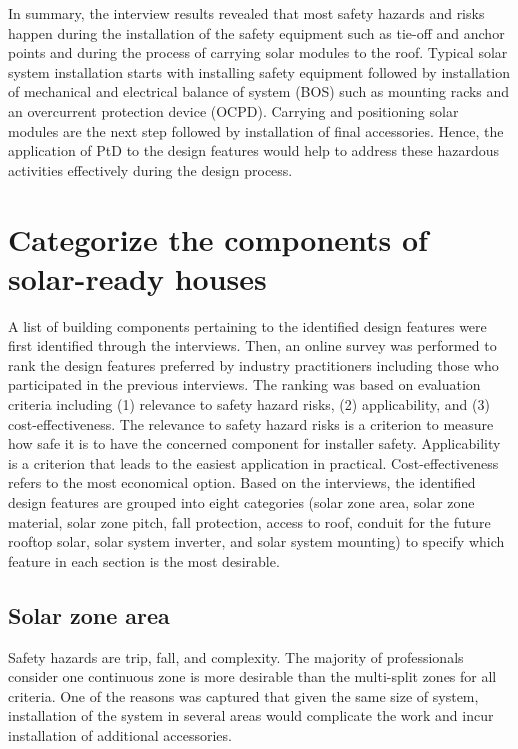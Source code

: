 \documentclass[]{article}
\begin{document}
In summary, the interview results revealed that most safety hazards and
risks happen during the installation of the safety equipment such as
tie-off and anchor points and during the process of carrying solar
modules to the roof. Typical solar system installation starts with
installing safety equipment followed by installation of mechanical and
electrical balance of system (BOS) such as mounting racks and an
overcurrent protection device (OCPD). Carrying and positioning solar
modules are the next step followed by installation of final accessories.
Hence, the application of PtD to the design features would help to
address these hazardous activities effectively during the design
process.

\hypertarget{categorize-the-components-of-solar-ready-houses}{%
\section{Categorize the components of solar-ready
houses}\label{categorize-the-components-of-solar-ready-houses}}

A list of building components pertaining to the identified design
features were first identified through the interviews. Then, an online
survey was performed to rank the design features preferred by industry
practitioners including those who participated in the previous
interviews. The ranking was based on evaluation criteria including (1)
relevance to safety hazard risks, (2) applicability, and (3)
cost-effectiveness. The relevance to safety hazard risks is a criterion
to measure how safe it is to have the concerned component for installer
safety. Applicability is a criterion that leads to the easiest
application in practical. Cost-effectiveness refers to the most
economical option. Based on the interviews, the identified design
features are grouped into eight categories (solar zone area, solar zone
material, solar zone pitch, fall protection, access to roof, conduit for
the future rooftop solar, solar system inverter, and solar system
mounting) to specify which feature in each section is the most
desirable.

\hypertarget{solar-zone-area}{%
\subsection{Solar zone area}\label{solar-zone-area}}

Safety hazards are trip, fall, and complexity. The majority of
professionals consider one continuous zone is more desirable than the
multi-split zones for all criteria. One of the reasons was captured that
given the same size of system, installation of the system in several
areas would complicate the work and incur installation of additional
accessories.
\end{document}
